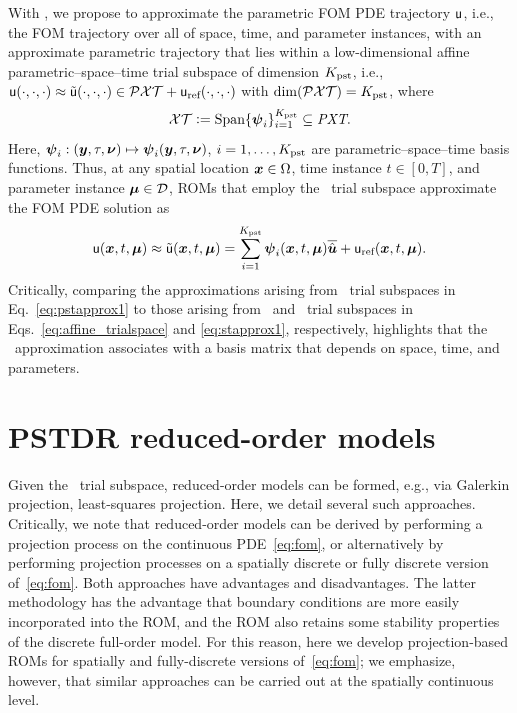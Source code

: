 \documentclass[3p,computermodern,10pt]{elsarticle}
\begin{document}
With \parametricSpaceTimeAcronym, we propose to approximate the parametric FOM PDE trajectory $\mathsf{u}$, i.e., the FOM trajectory over all of space, time, and parameter instances, with an approximate parametric trajectory that lies within a low-dimensional affine parametric--space--time trial subspace of dimension $K_{\text{pst}}$, i.e., $\mathsf{u}(\cdot,\cdot,\cdot) \approx \tilde{\mathsf{u}}(\cdot,\cdot,\cdot) \in \mathcal{PXT} + \mathsf{u}_{\text{ref}}(\cdot,\cdot,\cdot)$ with $\dim(\mathcal{PXT}) = K_{\text{pst}}$, where
\begin{equation}\label{eq:psttrialspace_def}
 \mathcal{XT} \vcentcolon= 
        \text{Span}\{\boldsymbol \psi_i\}_{i=1}^{K_{\text{pst}}} 
        \subseteq \textit{PXT}.
\end{equation}
Here, $\boldsymbol \psi_i: (\boldsymbol y,\tau,\boldsymbol \nu) \mapsto \boldsymbol \psi_i(\boldsymbol y,\tau,\boldsymbol \nu)$, $i=1,\ldots,K_{\text{pst}}$ are parametric--space--time basis functions.  Thus, at any spatial location $\boldsymbol x \in \Omega$, time instance $t\in[0,T]$, and parameter instance $\boldsymbol \mu \in \mathcal{D}$, ROMs that employ the
\parametricSpaceTimeAcronym\ trial subspace approximate the FOM PDE solution as
\begin{equation}\label{eq:pstapprox1}
 \mathsf{u}(\boldsymbol x, t,\boldsymbol \mu) \approx \tilde{\mathsf{u}}(\boldsymbol x, t,\boldsymbol \mu) = \sum_{i=1}^{K_{\text{pst}}} \boldsymbol \psi_i(\boldsymbol x, t,\boldsymbol \mu) \overline{\hat{\boldsymbol u}} + \mathsf{u}_{\text{ref}}(\boldsymbol x, t,\boldsymbol \mu).
\end{equation}
Critically, comparing the approximations arising from \parametricSpaceTimeAcronym\ trial subspaces in Eq.~\eqref{eq:pstapprox1} to those arising from \spatialAcronym\ and
\spaceTimeAcronym\ trial subspaces in Eqs.~\eqref{eq:affine_trialspace} and \eqref{eq:stapprox1}, respectively,
highlights that the \parametricSpaceTimeAcronym\ approximation associates with a basis matrix that depends on space, time, and parameters. 

\section{PSTDR reduced-order models}
Given the \parametricSpaceTimeAcronym\ trial subspace, reduced-order models can be formed, e.g., via Galerkin projection, least-squares projection. Here, we detail several such approaches. Critically, we note that reduced-order models can be derived by performing a projection process on the continuous PDE~\eqref{eq:fom}, or alternatively by performing projection processes on a spatially discrete or fully discrete version of~\eqref{eq:fom}. Both approaches have advantages and disadvantages. The latter methodology has the advantage that boundary conditions are more easily incorporated into the ROM, and the ROM also retains some stability properties of the discrete full-order model. For this reason, here we develop projection-based ROMs for spatially and fully-discrete versions of~\eqref{eq:fom}; we emphasize, however, that similar approaches can be carried out at the spatially continuous level.
\end{document}
